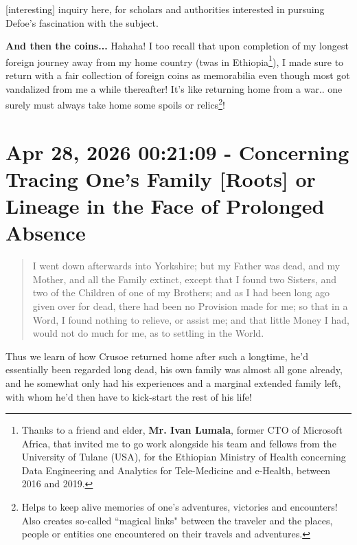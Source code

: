 \documentclass[a4paper]{article}
\begin{document}
[interesting] inquiry here, for scholars and authorities interested in pursuing Defoe's fascination with the subject.


\textbf{And then the coins...} Hahaha! I too recall that upon completion of my longest foreign journey away from my home country (twas in Ethiopia\footnote{Thanks to a friend and elder, \textbf{Mr. Ivan Lumala}, former CTO of Microsoft Africa, that invited me to go work alongside his team and fellows from the University of Tulane (USA), for the Ethiopian Ministry of Health concerning Data Engineering and Analytics for Tele-Medicine and e-Health, between 2016 and 2019.}), I made sure to return with a fair collection of foreign coins as memorabilia even though most got vandalized from me a while thereafter! It's like returning home from a war.. one surely must always take home some spoils or relics\footnote{Helps to keep alive memories of one's adventures, victories and encounters! Also creates so-called ``magical links" between the traveler and the places, people or entities one encountered on their travels and adventures.}!





\section{Apr 28, 2026 00:21:09 - Concerning Tracing One's Family [Roots] or Lineage in the Face of Prolonged Absence}
\label{SEC70}


\noindent
\begin{minipage}{1\textwidth}
\vspace{1em}
\begin{quotation}
{\ttfamily


I went down afterwards into Yorkshire; but my Father was dead, and my Mother, and all the Family extinct, except that I found two Sisters, and two of the Children of one of my Brothers; and as I had been long ago given over for dead, there had been no Provision made for me; so that in a Word, I found nothing to relieve, or assist me; and that little Money I had, would not do much for me, as to settling in the World.


}
\end{quotation}
\vspace{1em}
\end{minipage}




Thus we learn of how Crusoe returned home after such a longtime, he'd essentially been regarded long dead, his own family was almost all gone already, and he somewhat only had his experiences and a marginal extended family left, with whom he'd then have to kick-start the rest of his life!
\end{document}
